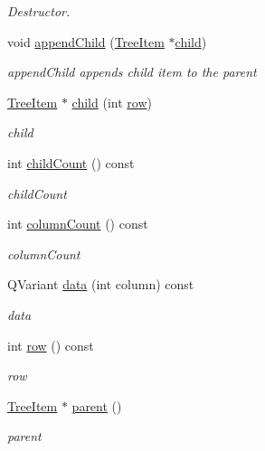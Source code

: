 \begin{DoxyCompactItemize}
\begin{DoxyCompactList}\small\item\em Destructor. \end{DoxyCompactList}\item 
void \hyperlink{class_tree_item_ac7f432ac0587ca037e80857eefd622f8}{append\-Child} (\hyperlink{class_tree_item}{Tree\-Item} $\ast$\hyperlink{class_tree_item_a80ab3164e41c8a43f1a9ef7255d88249}{child})
\begin{DoxyCompactList}\small\item\em append\-Child appends child item to the parent \end{DoxyCompactList}\item 
\hyperlink{class_tree_item}{Tree\-Item} $\ast$ \hyperlink{class_tree_item_a80ab3164e41c8a43f1a9ef7255d88249}{child} (int \hyperlink{class_tree_item_a5a062d24b35421360ad1d101c564e9be}{row})
\begin{DoxyCompactList}\small\item\em child \end{DoxyCompactList}\item 
int \hyperlink{class_tree_item_a55ffe6dd27750e479034b93e753f87af}{child\-Count} () const 
\begin{DoxyCompactList}\small\item\em child\-Count \end{DoxyCompactList}\item 
int \hyperlink{class_tree_item_a31c3fb89ad8e19ae696a310a1f843a8e}{column\-Count} () const 
\begin{DoxyCompactList}\small\item\em column\-Count \end{DoxyCompactList}\item 
Q\-Variant \hyperlink{class_tree_item_a16641e42c78f004d47a66f3b2c39341f}{data} (int column) const 
\begin{DoxyCompactList}\small\item\em data \end{DoxyCompactList}\item 
int \hyperlink{class_tree_item_a5a062d24b35421360ad1d101c564e9be}{row} () const 
\begin{DoxyCompactList}\small\item\em row \end{DoxyCompactList}\item 
\hyperlink{class_tree_item}{Tree\-Item} $\ast$ \hyperlink{class_tree_item_a392ec493dfab91ee474d7ff83e2c0211}{parent} ()
\begin{DoxyCompactList}\small\item\em parent \end{DoxyCompactList}\item 

\end{DoxyCompactItemize}
